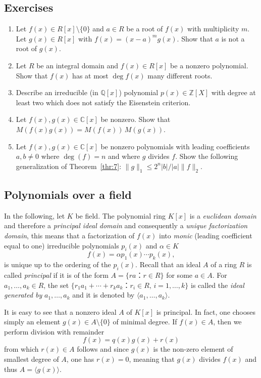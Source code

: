 \subsection*{Exercises}
\begin{enumerate}
\item Let $f(x) ∈ R[x]\setminus\{0\}$ and $a ∈R$ be a root of $f(x)$ with multiplicity $m$. Let $g(x) ∈ R[x] $ with $f(x) = (x-a)^m g(x)$. Show that $a$ is not a root of $g(x)$.
\item Let $R$ be an integral domain and  $f(x) ∈ R[x]$ be a nonzero polynomial. Show that $f(x)$ has at most $\deg f(x)$ many different roots.
\item Describe an irreducible (in $ℚ[x]$) polynomial $p(x) ∈ℤ[X]$ with degree at least two which does not satisfy the Eisenstein criterion.
\item Let  $f(x),g(x) ∈ℂ[x]$ be nonzero. Show that $M(f(x)g(x)) = M(f(x)) \, M (g(x))$.
\item Let $f(x),g(x) ∈ℂ[x]$ be nonzero polynomials with leading coefficients $a,b ≠0$ where $\deg (f) = n$ and where $g$ divides $f$. Show the following generalization of Theorem~\ref{thr:7}: $\|g\|_1 ≤ 2^n |b| / |a| \|f\|_2$. 
\end{enumerate}


\subsection{Polynomials over a field}
\label{sec:polyn-with-coeff}

In the following, let $K$ be field. The polynomial ring $K[x]$ is a \emph{euclidean domain} and therefore a \emph{principal ideal domain} and consequently a \emph{unique factorization domain}, this means that a factorization of $f(x)$ into \emph{monic} (leading coefficient equal to one) irreducible polynomials $p_i(x)$  and $α ∈K$ 
\begin{equation}
  \label{eq:3}
  f(x) = α p_1(x) \cdots p_k(x), 
\end{equation}
is unique up to the ordering of the $p_i(x)$. Recall that an ideal $A$ of a ring  $R$  is called \emph{principal} if it is of the form $A = \{ r a ： r ∈R\}$ for some $a ∈A$. For $a_1,\dots,a_k ∈R$, the set  $\{ r_1 a_1+ \cdots + r_k a_k ： r_i ∈R, \, i=1,\dots,k\}$ is called the \emph{ideal generated by} $a_1,\dots,a_k$ and it is  denoted by $〈a_1,\dots,a_k〉$. 

It is easy to see that a nonzero ideal $A$ of $K[x]$ is principal. In fact, one chooses simply an element $g(x) ∈A \setminus \{0\}$ of minimal degree. If $f(x) ∈A$, then we perform division with remainder
\begin{displaymath}
  f(x)  = q(x) g(x) + r(x) 
\end{displaymath}
from which $r(x) ∈A$ follows and since $g(x)$ is the non-zero  element of smallest degree of $A$, one has $r(x) = 0$, meaning that $g(x)$ divides $f(x)$ and thus $A = 〈g(x)〉$.

